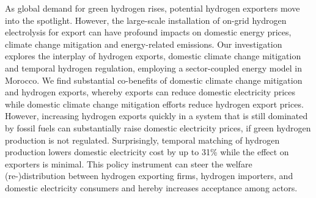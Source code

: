 




As global demand for green hydrogen rises, potential hydrogen exporters move into the spotlight.
However, the large-scale installation of on-grid hydrogen electrolysis for export can have profound impacts on domestic energy prices, climate change mitigation and energy-related emissions.
Our investigation explores the interplay of hydrogen exports, domestic climate change mitigation and temporal hydrogen regulation, employing a sector-coupled energy model in Morocco. 
We find substantial co-benefits of domestic climate change mitigation and hydrogen exports, whereby exports can reduce domestic electricity prices while domestic climate change mitigation efforts reduce hydrogen export prices.
However, increasing hydrogen exports quickly in a system that is still dominated by fossil fuels can substantially raise domestic electricity prices, if green hydrogen production is not regulated.
Surprisingly, temporal matching of hydrogen production lowers domestic electricity cost by up to 31\% while the effect on exporters is minimal. 
This policy instrument can steer the welfare (re-)distribution between hydrogen exporting firms, hydrogen importers, and domestic electricity consumers and hereby increases acceptance among actors.

